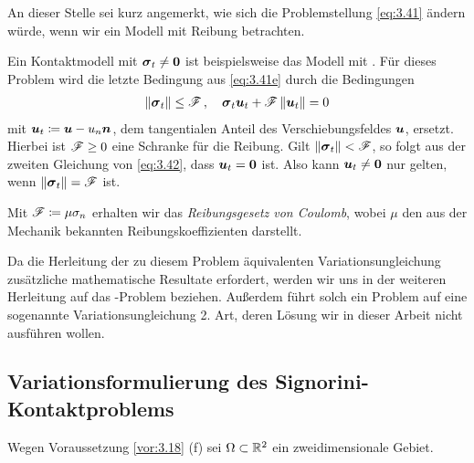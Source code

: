 An dieser Stelle sei kurz angemerkt, wie sich die Problemstellung \eqref{eq:3.41} ändern würde, wenn wir ein Modell mit Reibung betrachten.

\begin{bem}\label{bem:3.20}
Ein Kontaktmodell mit $\boldsymbol \sigma_t \not = \boldsymbol 0$ ist beispielsweise das Modell mit \textit{}. Für dieses Problem wird die letzte Bedingung aus \eqref{eq:3.41e} durch die Bedingungen
\begin{align}\label{eq:3.42}
	\lVert \boldsymbol \sigma_t\rVert \le \mathscr F \, , \quad \boldsymbol \sigma_t \boldsymbol u_t + \mathscr F\,  \lVert \boldsymbol u_t\rVert = 0
\end{align}
mit $\boldsymbol u_t \coloneqq \boldsymbol u - u_n \boldsymbol n$, dem tangentialen Anteil des Verschiebungsfeldes $\boldsymbol u$, ersetzt. Hierbei ist $\mathscr F \ge 0$ eine Schranke für die Reibung. Gilt $\lVert \boldsymbol \sigma_t\rVert < \mathscr F$, so folgt aus der zweiten Gleichung von \eqref{eq:3.42}, dass $\boldsymbol u_t = \boldsymbol 0$ ist. Also kann $\boldsymbol u_t \not=\boldsymbol 0$ nur gelten, wenn $\lVert \boldsymbol \sigma_t\rVert = \mathscr F$ ist.

Mit $\mathscr F \coloneqq \mu \sigma_n$ erhalten wir das \textit{Reibungsgesetz von Coulomb}, wobei $\mu$ den aus der Mechanik bekannten Reibungskoeffizienten darstellt.

Da die Herleitung der zu diesem Problem äquivalenten Variationsungleichung zusätzliche mathematische Resultate erfordert, werden wir uns in der weiteren Herleitung auf das -Problem beziehen. Außerdem führt solch ein Problem auf eine sogenannte Variationsungleichung 2. Art, deren Lösung wir in dieser Arbeit nicht ausführen wollen.
\end{bem}





\subsection{Variationsformulierung des Signorini-Kontaktproblems}
\label{kap:3.2.2}

\begin{erinnerung}
Wegen Voraussetzung \ref{vor:3.18} (f) sei $\Omega \subset \mathbb{R}^2$ ein zweidimensionale Gebiet.
\end{erinnerung}


